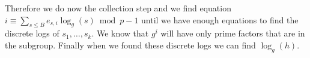\documentclass[12pt,a4paper]{article}
\begin{document}
Therefore we do now the collection step and we find equation $i \equiv \sum_{s\leq B}e_{s,i}\log_g(s) \bmod{p-1}$ until we have enough equations to find 
the discrete logs of $s_1,\dots,s_k$. We know that $g^i$ will have only prime factors that are in the subgroup.
Finally  when we found these discrete logs we can find $\log_g(h)$.
\end{document}
